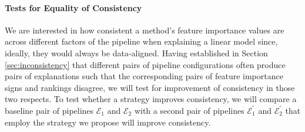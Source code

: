 \documentclass[mnsc,blindrev]{informs3}
\newcommand{\mE}{\mathcal{E}}
\begin{document}
            \paragraph{Tests for Equality of Consistency}
        We are interested in how consistent a method's feature importance values are across different factors of the pipeline when explaining a linear model since, ideally, they would always be data-aligned. Having established in Section \ref{sec:inconsistency} that different pairs of pipeline configurations often produce pairs of explanations such that the corresponding pairs of feature importance signs and rankings disagree, we will test for improvement of consistency in those two respects. To test whether a strategy improves consistency, we will compare a baseline pair of pipelines $\mE_1$ and $\mathcal{E}_2$ with a second pair of pipelines  $\mE^\prime_1$ and $\mE^\prime_2$ that employ the strategy we propose will improve consistency.
\end{document}
